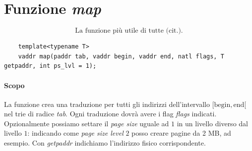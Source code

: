 \documentclass[11pt]{report}
\theoremstyle{definition}
\begin{document}
\section{Funzione \emph{map}}
\[\boxed{\text{La funzione più utile di tutte (cit.).}}\]
\begin{verbatim}
	template<typename T>
	vaddr map(paddr tab, vaddr begin, vaddr end, natl flags, T getpaddr, int ps_lvl = 1);
\end{verbatim}
\paragraph{Scopo} La funzione crea una traduzione per tutti gli indirizzi dell'intervallo $[\text{begin}, \text{end}[$ nel  trie di radice \emph{tab}. Ogni traduzione dovrà avere i flag \emph{flags} indicati. Opzionalmente possiamo settare il \emph{page size} uguale ad $1$ in un livello diverso dal livello $1$: indicando come \emph{page size level} $2$ posso creare pagine da 2 MB, ad esempio. Con \emph{getpaddr} indichiamo l'indirizzo fisico corrispondente.
\end{document}
